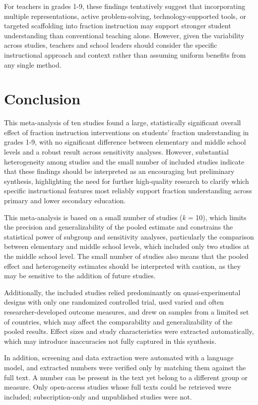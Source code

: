 \documentclass[man,a4paper,12pt,floatsintext,nolmodern,notab]{apa7}
\begin{document}
For teachers in grades 1-9, these findings tentatively suggest that incorporating multiple representations, active problem-solving, technology-supported tools, or targeted scaffolding into fraction instruction may support stronger student understanding than conventional teaching alone. However, given the variability across studies, teachers and school leaders should consider the specific instructional approach and context rather than assuming uniform benefits from any single method.

\section{Conclusion}
This meta-analysis of ten studies found a large, statistically significant overall effect of fraction instruction interventions on students' fraction understanding in grades 1-9, with no significant difference between elementary and middle school levels and a robust result across sensitivity analyses. However, substantial heterogeneity among studies and the small number of included studies indicate that these findings should be interpreted as an encouraging but preliminary synthesis, highlighting the need for further high-quality research to clarify which specific instructional features most reliably support fraction understanding across primary and lower secondary education.

This meta-analysis is based on a small number of studies (\textit{k} = 10), which limits the precision and generalizability of the pooled estimate and constrains the statistical power of subgroup and sensitivity analyses, particularly the comparison between elementary and middle school levels, which included only two studies at the middle school level. The small number of studies also means that the pooled effect and heterogeneity estimates should be interpreted with caution, as they may be sensitive to the addition of future studies.

Additionally, the included studies relied predominantly on quasi-experimental designs with only one randomized controlled trial, used varied and often researcher-developed outcome measures, and drew on samples from a limited set of countries, which may affect the comparability and generalizability of the pooled results. Effect sizes and study characteristics were extracted automatically, which may introduce inaccuracies not fully captured in this synthesis.

In addition, screening and data extraction were automated with a language model, and extracted numbers were verified only by matching them against the full text. A number can be present in the text yet belong to a different group or measure. Only open-access studies whose full texts could be retrieved were included; subscription-only and unpublished studies were not.
\end{document}
